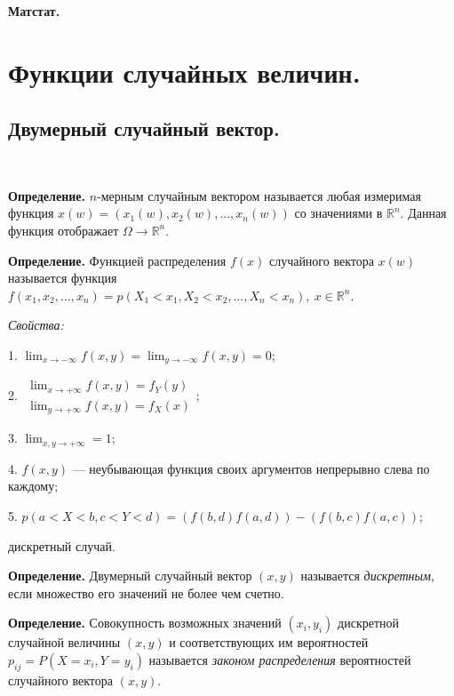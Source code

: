 \documentclass[9pt]{article}
\begin{document}
\begin{center}
    \huge\textbf{Матстат.}
\end{center}

\section{Функции случайных величин.}

\subsection{Двумерный случайный вектор.}

\ 
\par\textbf{Определение.} \(n\)-мерным случайным вектором называется любая измеримая функция \(x(w)=(x_1(w),x_2(w),...,x_n(w))\) со значениями в \(\mathbb R^n\). Данная функция отображает \(\Omega\to\mathbb R^n\).
\par\textbf{Определение.} Функцией распределения \(f(x)\) случайного вектора \(x(w)\) называется функция \( f(x_1,x_2,...,x_n) = p(X_1<x_1,X_2<x_2,...,X_n<x_n),\ x\in\mathbb R^n\).
\par\textit{Свойства:}
\par1. \(\displaystyle\lim_{x\to-\infty}f(x,y)=\lim_{y\to-\infty}f(x,y)=0\);
\par2. \(\begin{array}{l}
    \displaystyle\lim_{x\to+\infty}f(x,y)=f_Y(y) \\
    \displaystyle\lim_{y\to+\infty}f(x,y)=f_X(x) 
\end{array};\)
\par3. \(\displaystyle\lim_{x,y\to+\infty}=1\);
\par4. \(f(x,y)\) --- неубывающая функция своих аргументов непрерывно слева по каждому;
\par5. \(p(a<X<b,c<Y<d)=(f(b,d)f(a,d))-(f(b,c)f(a,c))\);


 дискретный случай. 
\par\textbf{Определение.} Двумерный случайный вектор \((x,y)\) называется \textit{дискретным}, если множество его значений не более чем счетно.
\par\textbf{Определение.} Совокупность возможных значений \((x_i,y_i)\) дискретной случайной величины \((x,y)\) и соответствующих им вероятностей \(p_{ij}=P(X=x_i,Y=y_i)\) называется \textit{законом распределения} вероятностей случайного вектора \((x,y)\).
\end{document}

